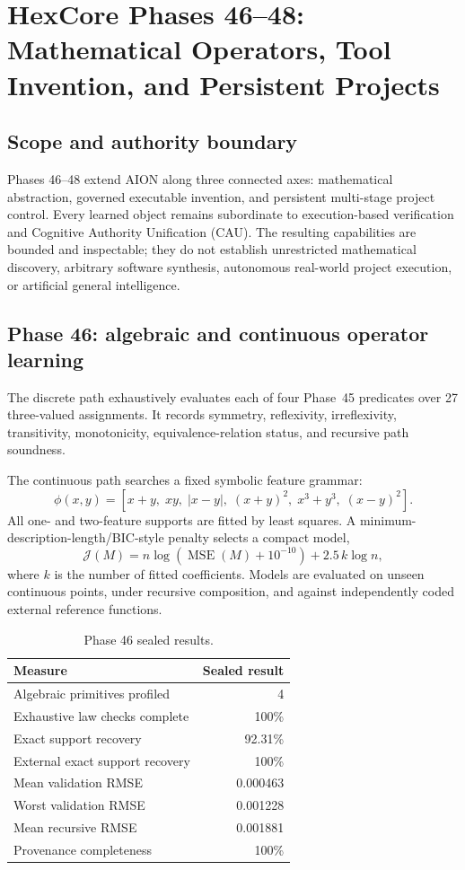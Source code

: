 \section{HexCore Phases 46--48: Mathematical Operators, Tool Invention, and Persistent Projects}
\label{sec:hexcore-phases-46-48}

\subsection{Scope and authority boundary}

Phases 46--48 extend AION along three connected axes: mathematical abstraction, governed executable invention, and persistent multi-stage project control.  Every learned object remains subordinate to execution-based verification and Cognitive Authority Unification (CAU).  The resulting capabilities are bounded and inspectable; they do not establish unrestricted mathematical discovery, arbitrary software synthesis, autonomous real-world project execution, or artificial general intelligence.

\subsection{Phase 46: algebraic and continuous operator learning}

The discrete path exhaustively evaluates each of four Phase~45 predicates over 27 three-valued assignments.  It records symmetry, reflexivity, irreflexivity, transitivity, monotonicity, equivalence-relation status, and recursive path soundness.

The continuous path searches a fixed symbolic feature grammar:
\[
\phi(x,y)=
\left[
x+y,\;
xy,\;
|x-y|,\;
(x+y)^2,\;
x^3+y^3,\;
(x-y)^2
\right].
\]
All one- and two-feature supports are fitted by least squares.  A minimum-description-length/BIC-style penalty selects a compact model,
\[
\mathcal{J}(M)
=
n\log\!\left(\operatorname{MSE}(M)+10^{-10}\right)
+2.5\,k\log n,
\]
where \(k\) is the number of fitted coefficients.  Models are evaluated on unseen continuous points, under recursive composition, and against independently coded external reference functions.

\begin{table}[ht]
\centering
\begin{tabular}{lr}
\hline
Measure & Sealed result\\
\hline
Algebraic primitives profiled & 4\\
Exhaustive law checks complete & 100\%\\
Exact support recovery & 92.31\%\\
External exact support recovery & 100\%\\
Mean validation RMSE & 0.000463\\
Worst validation RMSE & 0.001228\\
Mean recursive RMSE & 0.001881\\
Provenance completeness & 100\%\\
\hline
\end{tabular}
\caption{Phase 46 sealed results.}
\end{table}

